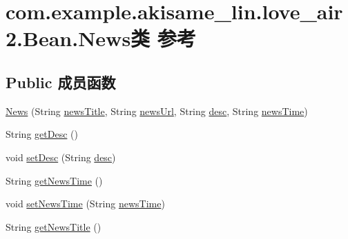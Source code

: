 \hypertarget{classcom_1_1example_1_1akisame__lin_1_1love__air2_1_1_bean_1_1_news}{}\section{com.\+example.\+akisame\+\_\+lin.\+love\+\_\+air2.\+Bean.\+News类 参考}
\label{classcom_1_1example_1_1akisame__lin_1_1love__air2_1_1_bean_1_1_news}
\subsection*{Public 成员函数}
\begin{DoxyCompactItemize}
\item 
\mbox{\hyperlink{classcom_1_1example_1_1akisame__lin_1_1love__air2_1_1_bean_1_1_news_aacbc6a26c079e6ec048dfda2a6c049e8}{News}} (String \mbox{\hyperlink{classcom_1_1example_1_1akisame__lin_1_1love__air2_1_1_bean_1_1_news_a8411f573d677ee70b803d527a55df3ee}{news\+Title}}, String \mbox{\hyperlink{classcom_1_1example_1_1akisame__lin_1_1love__air2_1_1_bean_1_1_news_aefc115f63d7ef0075b791a97c975d637}{news\+Url}}, String \mbox{\hyperlink{classcom_1_1example_1_1akisame__lin_1_1love__air2_1_1_bean_1_1_news_a0152ab53efe53f8bca4ac70ccd159032}{desc}}, String \mbox{\hyperlink{classcom_1_1example_1_1akisame__lin_1_1love__air2_1_1_bean_1_1_news_a576072d37ac4745fc09c5e112bd5be68}{news\+Time}})
\item 
String \mbox{\hyperlink{classcom_1_1example_1_1akisame__lin_1_1love__air2_1_1_bean_1_1_news_a41c085f98aa8f1fbdecbdf179fc18d86}{get\+Desc}} ()
\item 
void \mbox{\hyperlink{classcom_1_1example_1_1akisame__lin_1_1love__air2_1_1_bean_1_1_news_afa55c04ae1ab94d1adbdd06253ffd42d}{set\+Desc}} (String \mbox{\hyperlink{classcom_1_1example_1_1akisame__lin_1_1love__air2_1_1_bean_1_1_news_a0152ab53efe53f8bca4ac70ccd159032}{desc}})
\item 
String \mbox{\hyperlink{classcom_1_1example_1_1akisame__lin_1_1love__air2_1_1_bean_1_1_news_a60b23cb26609f5c8e30ce7922a6a8e0a}{get\+News\+Time}} ()
\item 
void \mbox{\hyperlink{classcom_1_1example_1_1akisame__lin_1_1love__air2_1_1_bean_1_1_news_a704cffb2d5a06d25f176cc73d6037dbc}{set\+News\+Time}} (String \mbox{\hyperlink{classcom_1_1example_1_1akisame__lin_1_1love__air2_1_1_bean_1_1_news_a576072d37ac4745fc09c5e112bd5be68}{news\+Time}})
\item 
String \mbox{\hyperlink{classcom_1_1example_1_1akisame__lin_1_1love__air2_1_1_bean_1_1_news_a897353dab42e35afe290568152492e2b}{get\+News\+Title}} ()

\end{DoxyCompactItemize}
